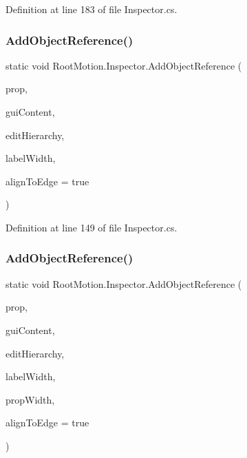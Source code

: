 Definition at line 183 of file Inspector.\+cs.

\mbox{\label{class_root_motion_1_1_inspector_a403b9146e788460c20703b7727939a5b}} 
\subsubsection{\texorpdfstring{Add\+Object\+Reference()}{AddObjectReference()}\hspace{0.1cm}{\footnotesize\ttfamily [1/2]}}
{\footnotesize\ttfamily static void Root\+Motion.\+Inspector.\+Add\+Object\+Reference (\begin{DoxyParamCaption}\item[{Serialized\+Property}]{prop,  }\item[{G\+U\+I\+Content}]{gui\+Content,  }\item[{bool}]{edit\+Hierarchy,  }\item[{int}]{label\+Width,  }\item[{bool}]{align\+To\+Edge = {\ttfamily true} }\end{DoxyParamCaption})\hspace{0.3cm}{\ttfamily [static]}}



Definition at line 149 of file Inspector.\+cs.

\mbox{\label{class_root_motion_1_1_inspector_ae43406ffdb66cf7d98106053019182a7}} 
\subsubsection{\texorpdfstring{Add\+Object\+Reference()}{AddObjectReference()}\hspace{0.1cm}{\footnotesize\ttfamily [2/2]}}
{\footnotesize\ttfamily static void Root\+Motion.\+Inspector.\+Add\+Object\+Reference (\begin{DoxyParamCaption}\item[{Serialized\+Property}]{prop,  }\item[{G\+U\+I\+Content}]{gui\+Content,  }\item[{bool}]{edit\+Hierarchy,  }\item[{int}]{label\+Width,  }\item[{int}]{prop\+Width,  }\item[{bool}]{align\+To\+Edge = {\ttfamily true} }\end{DoxyParamCaption})\hspace{0.3cm}{\ttfamily [static]}}



